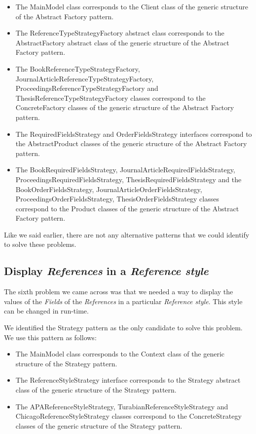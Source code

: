 \documentclass[a4paper]{article}
\begin{document}
\begin{itemize}
	\item The MainModel class corresponds to the Client class of the generic structure of the Abstract Factory pattern.
	\item The ReferenceTypeStrategyFactory abstract class corresponds to the AbstractFactory abstract class of the generic structure of the Abstract Factory pattern.
	\item The BookReferenceTypeStrategyFactory, JournalArticleReferenceTypeStrategyFactory, ProceedingsReferenceTypeStrategyFactory and ThesisReferenceTypeStrategyFactory classes correspond to the ConcreteFactory classes of the generic structure of the Abstract Factory pattern.
	\item The RequiredFieldsStrategy and OrderFieldsStrategy interfaces correspond to the AbstractProduct classes of the generic structure of the Abstract Factory pattern.
	\item The BookRequiredFieldsStrategy, JournalArticleRequiredFieldsStrategy, ProceedingsRequiredFieldsStrategy, ThesisRequiredFieldsStrategy and the BookOrderFieldsStrategy, JournalArticleOrderFieldsStrategy, ProceedingsOrderFieldsStrategy, ThesisOrderFieldsStrategy classes correspond to the Product classes of the generic structure of the Abstract Factory pattern.
\end{itemize}

Like we said earlier, there are not any alternative patterns that we could identify to solve these problems.

\subsection{Display \textit{References} in a \textit{Reference style}}
The sixth problem we came across was that we needed a way to display the values of the \textit{Fields} of the \textit{References} in a particular \textit{Reference style}. This style can be changed in run-time.

We identified the Strategy pattern as the only candidate to solve this problem. We use this pattern as follows:

\begin{itemize}
	\item The MainModel class corresponds to the Context class of the generic structure of the Strategy pattern.
	\item The ReferenceStyleStrategy interface corresponds to the Strategy abstract class of the generic structure of the Strategy pattern.
	\item The APAReferenceStyleStrategy, TurabianReferenceStyleStrategy and ChicagoReferenceStyleStrategy classes correspond to the ConcreteStrategy classes of the generic structure of the Strategy pattern.
\end{itemize}
\end{document}
